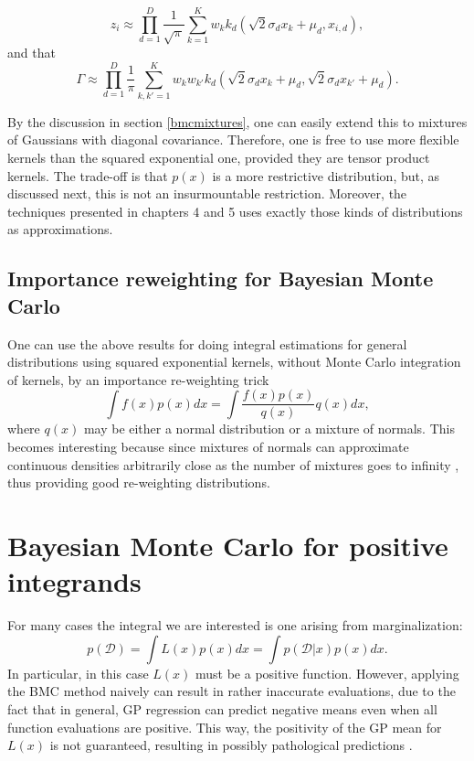 \begin{equation}
 z_i \approx \prod_{d=1}^D \frac{1}{\sqrt{\pi}}\sum_{k=1}^K w_k k_d(\sqrt{2} \sigma_d x_k + \mu_d,x_{i,d}),
\end{equation}
and that
\begin{equation}
\Gamma \approx \prod_{d=1}^D \frac{1}{\pi} \sum_{k,k'=1}^K w_k w_{k'} k_d(\sqrt{2} \sigma_d x_k + \mu_d,\sqrt{2} \sigma_d x_{k'} + \mu_d).
\end{equation}

By the discussion in section \ref{bmcmixtures}, one can easily extend this to mixtures of Gaussians with diagonal covariance. Therefore, one is free to use more flexible kernels than the squared exponential one, provided they are tensor product kernels. The trade-off is that $p(x)$ is a more restrictive distribution, but, as discussed next, this is not an insurmountable restriction. Moreover, the techniques presented in chapters 4 and 5 uses exactly those kinds of distributions as approximations.

\subsection{Importance reweighting for Bayesian Monte Carlo}
One can use the above results for doing integral estimations for general distributions using squared exponential kernels, without Monte Carlo integration of kernels, by an importance re-weighting trick
\begin{equation}
\int f(x) p(x) dx = \int \frac{f(x) p(x)}{q(x)} q(x) dx,
\end{equation}
where $q(x)$ may be either a normal distribution or a mixture of normals. This becomes interesting because since mixtures of normals can approximate continuous densities arbitrarily close as the number of mixtures goes to infinity \cite{Epanechnikov_1969}, thus providing good re-weighting distributions.


\section{Bayesian Monte Carlo for positive integrands}\label{positivebmc}
For many cases the integral we are interested is one arising from marginalization:
\begin{equation}
 p(\mathcal{D}) = \int L(x) p(x) dx = \int p(\mathcal{D}|x) p(x) dx.
\end{equation}
In particular, in this case $L(x)$ must be a positive function. However, applying the BMC method naively can result in rather inaccurate evaluations, due to the fact that in general, GP regression can predict negative means even when all function evaluations are positive. This way, the positivity of the GP mean for $L(x)$ is not guaranteed, resulting in possibly pathological predictions \cite{Ghahramani_2003}.

